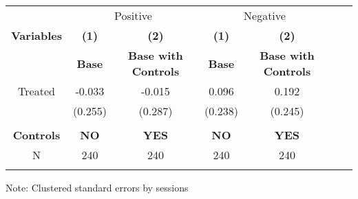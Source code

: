  \begin{table}[htbp]
    \begin{tabular}{c c c c c c c }
    \toprule
    &\multicolumn{2}{c}{Positive}         &\multicolumn{2}{c}{Negative}      \\

    \textbf{Variables} & \textbf{(1)} & \textbf{(2)}  & \textbf{(1)} & \textbf{(2)}              \\ 

    \textbf & \textbf{ Base } & \textbf{Base with Controls}  & \textbf{ Base } & \textbf{Base with Controls}  \\ 

    \midrule
     Treated           & -0.033      & -0.015      & 0.096      & 0.192  \\
                       & (0.255)     & (0.287)     & (0.238)    & (0.245)   \\
                       &             &             &            &                  \\
\midrule
    
\textbf{Controls} & \textbf{ NO } & \textbf{YES}  & \textbf{ NO } & \textbf{YES}  \\ 
    \midrule
     N                  &   240          &      240  &     240  &     240        \\          
    \bottomrule
    \addlinespace[1ex]
    \multicolumn{3}{l}{\textsuperscript{***}$p<0.01$, 
      \textsuperscript{**}$p<0.05$, 
      \textsuperscript{*}$p<0.1$}
    \end{tabular}
    \newline
    Note: Clustered standard errors by sessions
\end{table}
